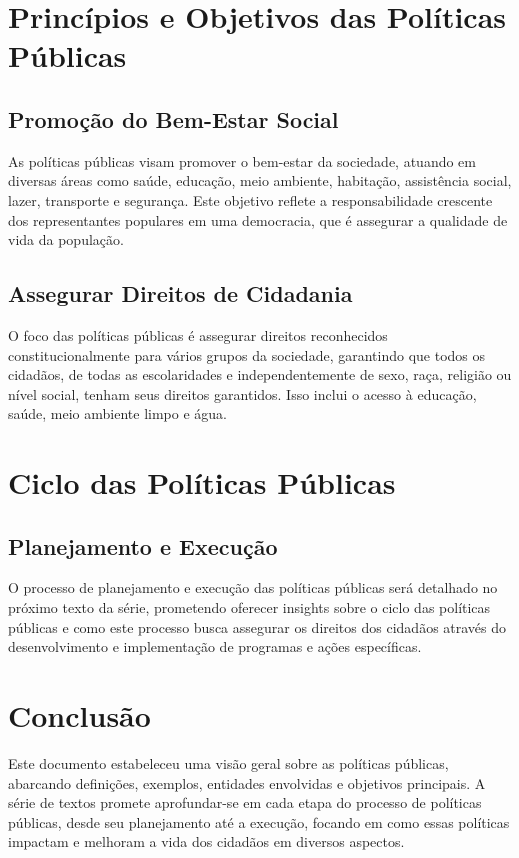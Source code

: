 \documentclass[
   article,       
   12pt,          
   oneside,       
   a4paper,       
   english,       
   brazil,        
   sumario=tradicional
   ]{abntex2}
\begin{document}
\section{Princípios e Objetivos das Políticas Públicas}
\subsection{Promoção do Bem-Estar Social}
As políticas públicas visam promover o bem-estar da sociedade, atuando em diversas áreas como saúde, educação, meio ambiente, habitação, assistência social, lazer, transporte e segurança. Este objetivo reflete a responsabilidade crescente dos representantes populares em uma democracia, que é assegurar a qualidade de vida da população.

\subsection{Assegurar Direitos de Cidadania}
O foco das políticas públicas é assegurar direitos reconhecidos constitucionalmente para vários grupos da sociedade, garantindo que todos os cidadãos, de todas as escolaridades e independentemente de sexo, raça, religião ou nível social, tenham seus direitos garantidos. Isso inclui o acesso à educação, saúde, meio ambiente limpo e água.

\section{Ciclo das Políticas Públicas}
\subsection{Planejamento e Execução}
O processo de planejamento e execução das políticas públicas será detalhado no próximo texto da série, prometendo oferecer insights sobre o ciclo das políticas públicas e como este processo busca assegurar os direitos dos cidadãos através do desenvolvimento e implementação de programas e ações específicas.

\section{Conclusão}
Este documento estabeleceu uma visão geral sobre as políticas públicas, abarcando definições, exemplos, entidades envolvidas e objetivos principais. A série de textos promete aprofundar-se em cada etapa do processo de políticas públicas, desde seu planejamento até a execução, focando em como essas políticas impactam e melhoram a vida dos cidadãos em diversos aspectos.
\end{document}
